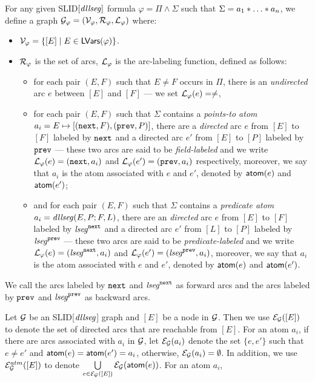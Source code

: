 \documentclass{llncs}
\begin{document}
\newcommand\couple{\mathsf{Cpl}}

\begin{definition}%
For any given SLID$[\mathit{dllseg}]$ formula $\varphi = \Pi \wedge \Sigma$ such that $\Sigma = a_1 \sep \dots \sep a_n$, we define a graph
 $\mathcal{G}_\varphi=(\mathcal{V}_\varphi, \mathcal{R}_\varphi,   \mathcal{L}_{\varphi})$ where:

\begin{itemize}
\item $\mathcal{V}_\varphi = \{[E] \mid E \in \mathsf{LVars}(\varphi)\}$.

\item  $\mathcal{R}_\varphi$ is the set of arcs, $\mathcal{L}_{\varphi}$ is the arc-labeling function, defined as follows:
\begin{itemize}
\item for each pair $(E, F)$ such that $E \neq F$ occurs in $\Pi$, there is an \emph{undirected} arc $e$ between $[E]$ and $[F]$ --- we set $\mathcal{L}_{\varphi}(e) =\neq$,
%
\item for each pair $(E,F)$ such that $\Sigma$ contains a \emph{points-to atom} $a_i=E \mapsto [(\mathtt{next},F), (\mathtt{prev},P)]$, there are a \emph{directed} arc $e$ from $[E]$ to $[F]$ labeled by $\mathtt{next}$ and a directed arc $e'$ from $[E]$ to $[P]$ labeled by $\mathtt{prev}$ --- these two arcs are said to be \emph{field-labeled} and we write $\mathcal{L}_{\varphi}(e)= (\mathtt{next},a_i)$ and $\mathcal{L}_{\varphi}(e')= (\mathtt{prev},a_i)$ respectively, moreover, we say that $a_i$ is the atom associated with $e$ and $e'$, denoted by $\mathsf{atom}(e)$ and $\mathsf{atom}({e'})$;

%
\item and for each pair $(E,F)$ such that $\Sigma$ contains a \emph{predicate atom} $a_i=\mathit{dllseg}(E, P;F, L)$, there are an \emph{directed} arc $e$ from $[E]$ to $[F]$ labeled by $\mathit{lseg}^{\mathtt{next}}$ and a directed arc $e'$ from $[L]$ to $[P]$ labeled by $\mathit{lseg}^{\mathtt{prev}}$  --- these two arcs are said to be \emph{predicate-labeled}  and we write $\mathcal{L}_{\varphi}(e)= (\mathit{lseg}^{\mathtt{next}},a_i)$ and $\mathcal{L}_\varphi(e')=(\mathit{lseg}^{\mathtt{prev}}, a_i)$, moreover, we say that $a_i$ is the atom associated with $e$ and $e'$, denoted by $\mathsf{atom}(e)$ and $\mathsf{atom}({e'})$. 
\end{itemize}
\end{itemize}
We call the arcs labeled by $\mathtt{next}$ and $\mathit{lseg}^{\mathtt{next}}$ as forward arcs and the arcs labeled by $\mathtt{prev}$ and $\mathit{lseg}^{\mathtt{prev}}$ as backward arcs.
\end{definition}
Let $\mathcal{G}$ be an SLID[$\mathit{dllseg}$] graph and $[E]$ be a node in $\mathcal{G}$. Then we use $\mathcal{E}_{\mathcal{G}}([E])$ to denote the set of directed arcs that are reachable from $[E]$. For an atom $a_i$, if there are arcs associated with $a_i$ in $\mathcal{G}$, let $\mathcal{E}_{\mathcal{G}}(a_i)$ denote the set $\{e,e'\}$ such that $e \neq e'$ and $\mathsf{atom}(e)=\mathsf{atom}(e')=a_i$, otherwise, $\mathcal{E}_{\mathcal{G}}(a_i) = \emptyset$. In addition, we use $\mathcal{E}^{atm}_{\mathcal{G}}([E])$ to denote $\bigcup \limits_{e \in \mathcal{E}_{\mathcal{G}}([E])} \mathcal{E}_{\mathcal{G}}(\mathsf{atom}(e))$. For an atom $a_i$, 
\end{document}
